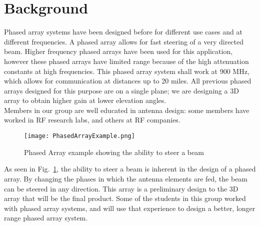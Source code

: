 \documentclass[UROP.tex]{subfiles}
\begin{document}
\bigskip
\section{\Large Background}
	Phased array systems have been designed before for different use cases and at different frequencies.  A phased array allows for fast steering of a very directed beam.  Higher frequency phased arrays have been used for this application, however these phased arrays have limited range because of the high attenuation constants at high frequencies.  This phased array system shall work at 900 MHz, which allows for communication at distances up to 20 miles.  All previous phased arrays designed for this purpose are on a single plane; we are designing a 3D array to obtain higher gain at lower elevation angles. \\
	
	Members in our group are well educated in antenna design: some members have worked in RF research labs, and others at RF companies.  
	
\begin{figure}[H]
\centering
	\texttt{[image: PhasedArrayExample.png]}
	\caption{ Phased Array example showing the ability to steer a beam\label{fig:PAexample}}
\end{figure}
	
	As seen in Fig.~\ref{fig:PAexample}, the ability to steer a beam is inherent in the design of a phased array.  By changing the phases in which the antenna elements are fed, the beam can be steered in any direction. This array is a preliminary design to the 3D array that will be the final product.  Some of the students in this group worked with phased array systems, and will use that experience to design a better, longer range phased array system.  
\end{document}
